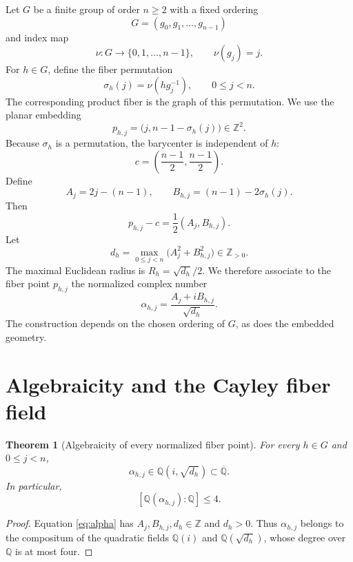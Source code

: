 \documentclass[11pt,a4paper]{article}
\newtheorem{theorem}{Theorem}[section]
\theoremstyle{definition}
\newcommand{\Q}{\mathbb{Q}}
\newcommand{\Z}{\mathbb{Z}}
\begin{document}
Let $G$ be a finite group of order $n\ge 2$ with a fixed ordering
\[
G=(g_0,g_1,\ldots,g_{n-1})
\]
and index map
\[
\nu:G\longrightarrow \{0,1,\ldots,n-1\},\qquad \nu(g_j)=j.
\]
For $h\in G$, define the fiber permutation
\begin{equation}
\label{eq:sigma}
\sigma_h(j)=\nu(hg_j^{-1}),\qquad 0\le j<n.
\end{equation}
The corresponding product fiber is the graph of this permutation.  We use the planar embedding
\begin{equation}
\label{eq:rawpoints}
p_{h,j}=\bigl(j,n-1-\sigma_h(j)\bigr)\in\Z^2.
\end{equation}
Because $\sigma_h$ is a permutation, the barycenter is independent of $h$:
\begin{equation}
\label{eq:bary}
c=\left(\frac{n-1}{2},\frac{n-1}{2}\right).
\end{equation}
Define
\begin{equation}
\label{eq:AB}
A_j=2j-(n-1),\qquad B_{h,j}=(n-1)-2\sigma_h(j).
\end{equation}
Then
\[
p_{h,j}-c=\frac12(A_j,B_{h,j}).
\]
Let
\begin{equation}
\label{eq:dh}
d_h=\max_{0\le j<n}\bigl(A_j^2+B_{h,j}^2\bigr)\in\Z_{>0}.
\end{equation}
The maximal Euclidean radius is $R_h=\sqrt{d_h}/2$.  We therefore associate to the fiber point $p_{h,j}$ the normalized complex number
\begin{equation}
\label{eq:alpha}
\boxed{
\alpha_{h,j}=\frac{A_j+iB_{h,j}}{\sqrt{d_h}}.
}
\end{equation}
The construction depends on the chosen ordering of $G$, as does the embedded geometry.

\section{Algebraicity and the Cayley fiber field}

\begin{theorem}[Algebraicity of every normalized fiber point]
\label{thm:algebraic}
For every $h\in G$ and $0\le j<n$,
\[
\alpha_{h,j}\in\Q(i,\sqrt{d_h})\subset\overline{\Q}.
\]
In particular,
\[
[\Q(\alpha_{h,j}):\Q]\le 4.
\]
\end{theorem}

\begin{proof}
Equation \eqref{eq:alpha} has $A_j,B_{h,j},d_h\in\Z$ and $d_h>0$.  Thus $\alpha_{h,j}$ belongs to the compositum of the quadratic fields $\Q(i)$ and $\Q(\sqrt{d_h})$, whose degree over $\Q$ is at most four.
\end{proof}
\end{document}
